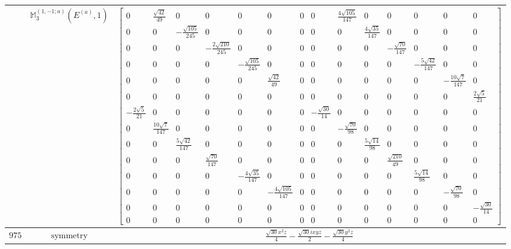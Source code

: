 \documentclass[fleqn,8pt,landscape]{jsarticle}
\begin{document}
\begin{longtable}{ccc}
$  $ & $ \mathbb{M}_{3}^{(1,-1;a)}(E^{(a)},1) $ & $ \begin{bmatrix} 0 & \frac{\sqrt{42}}{49} & 0 & 0 & 0 & 0 & 0 & 0 & \frac{4 \sqrt{105}}{147} & 0 & 0 & 0 & 0 & 0 \\ 0 & 0 & - \frac{\sqrt{105}}{245} & 0 & 0 & 0 & 0 & 0 & 0 & \frac{4 \sqrt{35}}{147} & 0 & 0 & 0 & 0 \\ 0 & 0 & 0 & - \frac{2 \sqrt{210}}{245} & 0 & 0 & 0 & 0 & 0 & 0 & - \frac{\sqrt{70}}{147} & 0 & 0 & 0 \\ 0 & 0 & 0 & 0 & - \frac{\sqrt{105}}{245} & 0 & 0 & 0 & 0 & 0 & 0 & - \frac{5 \sqrt{42}}{147} & 0 & 0 \\ 0 & 0 & 0 & 0 & 0 & \frac{\sqrt{42}}{49} & 0 & 0 & 0 & 0 & 0 & 0 & - \frac{10 \sqrt{7}}{147} & 0 \\ 0 & 0 & 0 & 0 & 0 & 0 & 0 & 0 & 0 & 0 & 0 & 0 & 0 & \frac{2 \sqrt{5}}{21} \\ - \frac{2 \sqrt{5}}{21} & 0 & 0 & 0 & 0 & 0 & 0 & - \frac{\sqrt{30}}{14} & 0 & 0 & 0 & 0 & 0 & 0 \\ 0 & \frac{10 \sqrt{7}}{147} & 0 & 0 & 0 & 0 & 0 & 0 & - \frac{\sqrt{70}}{98} & 0 & 0 & 0 & 0 & 0 \\ 0 & 0 & \frac{5 \sqrt{42}}{147} & 0 & 0 & 0 & 0 & 0 & 0 & \frac{5 \sqrt{14}}{98} & 0 & 0 & 0 & 0 \\ 0 & 0 & 0 & \frac{\sqrt{70}}{147} & 0 & 0 & 0 & 0 & 0 & 0 & \frac{\sqrt{210}}{49} & 0 & 0 & 0 \\ 0 & 0 & 0 & 0 & - \frac{4 \sqrt{35}}{147} & 0 & 0 & 0 & 0 & 0 & 0 & \frac{5 \sqrt{14}}{98} & 0 & 0 \\ 0 & 0 & 0 & 0 & 0 & - \frac{4 \sqrt{105}}{147} & 0 & 0 & 0 & 0 & 0 & 0 & - \frac{\sqrt{70}}{98} & 0 \\ 0 & 0 & 0 & 0 & 0 & 0 & 0 & 0 & 0 & 0 & 0 & 0 & 0 & - \frac{\sqrt{30}}{14} \\ 0 & 0 & 0 & 0 & 0 & 0 & 0 & 0 & 0 & 0 & 0 & 0 & 0 & 0 \end{bmatrix} $ \\ \hline
$ 975 $ & $ \text{symmetry} $ & $ \frac{\sqrt{30} x^{2} z}{4} - \frac{\sqrt{30} i x y z}{2} - \frac{\sqrt{30} y^{2} z}{4} $ \\

\end{longtable}
\end{document}
